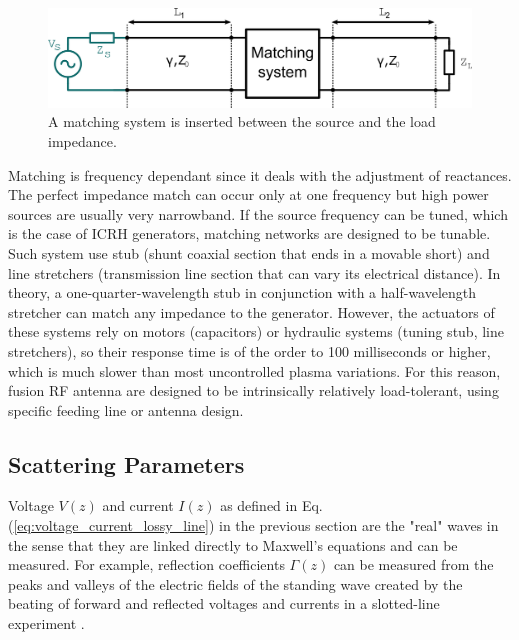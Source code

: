 \begin{figure}
	\includegraphics[width=1\linewidth]{figures/chap3/transmission_line_matching_system}
	\caption{A matching system is inserted between the source and the load impedance.}
	\label{fig:transmission_matching_system}
\end{figure}

Matching is frequency dependant since it deals with the adjustment of reactances. The perfect impedance match can occur only at one frequency but high power sources are usually very narrowband. If the source frequency can be tuned, which is the case of ICRH generators, matching networks are designed to be tunable. Such system use stub (shunt coaxial section that ends in a movable short) and line stretchers (transmission line section that can vary its electrical distance). In theory, a one-quarter-wavelength stub in conjunction with a half-wavelength stretcher can match any impedance to the generator. However, the actuators of these systems rely on motors (capacitors) or hydraulic systems (tuning stub, line stretchers), so their response time is of the order to 100 milliseconds or higher, which is much slower than most uncontrolled plasma variations. For this reason, fusion RF antenna are designed to be intrinsically relatively load-tolerant, using specific feeding line or antenna design. 


\subsection{Scattering Parameters}
Voltage  $V(z)$ and current $I(z)$ as defined in Eq.(\ref{eq:voltage_current_lossy_line}) in the previous section are the "real" waves in the sense that they are linked directly to Maxwell’s equations and can be measured. For example, reflection coefficients $\Gamma(z)$ can be measured from the peaks and valleys of the electric fields of the standing wave created by the beating of forward and reflected voltages and currents in a slotted-line experiment . 

